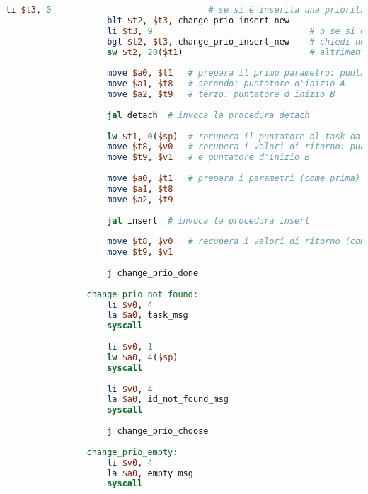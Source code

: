 \begin{center}
\begin{lstlisting}[language=mips, gobble=14, stepnumber=1]
                    li $t3, 0                               # se si è inserita una priorità minore di 0
                    blt $t2, $t3, change_prio_insert_new
                    li $t3, 9                               # o se si è inserita una priorità maggiore di 9
                    bgt $t2, $t3, change_prio_insert_new    # chiedi nuovamente la priorità del task
                    sw $t2, 20($t1)                         # altrimenti aggiorna la priorità nell'heap
                
                    move $a0, $t1   # prepara il primo parametro: puntatore al task da modificare
                    move $a1, $t8   # secondo: puntatore d'inizio A
                    move $a2, $t9   # terzo: puntatore d'inizio B
                    
                    jal detach  # invoca la procedura detach
                    
                    lw $t1, 0($sp)  # recupera il puntatore al task da modificare dallo stack
                    move $t8, $v0   # recupera i valori di ritorno: puntatore d'inizio A
                    move $t9, $v1   # e puntatore d'inizio B
                    
                    move $a0, $t1   # prepara i parametri (come prima)
                    move $a1, $t8
                    move $a2, $t9
                    
                    jal insert  # invoca la procedura insert
                    
                    move $t8, $v0   # recupera i valori di ritorno (come prima)
                    move $t9, $v1
                    
                    j change_prio_done
                
                change_prio_not_found:
                    li $v0, 4
                    la $a0, task_msg
                    syscall
                    
                    li $v0, 1
                    lw $a0, 4($sp)
                    syscall
                    
                    li $v0, 4
                    la $a0, id_not_found_msg
                    syscall
                    
                    j change_prio_choose
                    
                change_prio_empty:
                    li $v0, 4
                    la $a0, empty_msg
                    syscall
                    

\end{lstlisting}
\end{center}
